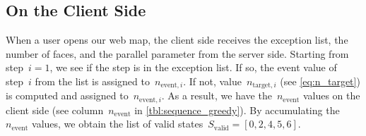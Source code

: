 \documentclass[]{interact}
\begin{document}



\subsection{On the Client Side}
\label{sec:communicate_client}


When a user opens our web map,
the client side receives the exception list, the number of faces, 
and the parallel parameter from the server side.
Starting from step~$i=1$,
we see if the step is in the exception list.
If so, the event value of step~$i$ from the list 
is assigned to~$n_{\mathrm{event},i}$.
If not, value~$n_{\mathrm{target},i}$ (see \eq\ref{eq:n_target})
is computed and assigned to~$n_{\mathrm{event},i}$.
As a result, we have the~$n_\mathrm{event}$ values on the client side
(see column~$n_\mathrm{event}$ in \tabl\ref{tbl:sequence_greedy}).
By accumulating the~$n_\mathrm{event}$ values,
we obtain the list of valid states~$S_\mathrm{valid} = [0, 2, 4, 5, 6]$.
\end{document}
